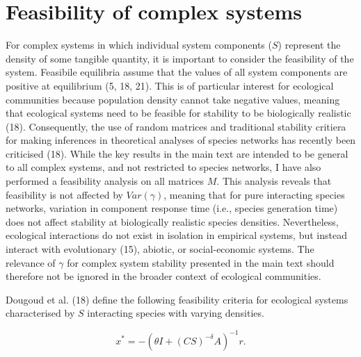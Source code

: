 \documentclass[]{article}
\begin{document}
\hypertarget{Feasibility}{\section{Feasibility of complex
systems}\label{Feasibility}}

For complex systems in which individual system components (\(S\))
represent the density of some tangible quantity, it is important to
consider the feasibility of the system. Feasibile equilibria assume that
the values of all system components are positive at equilibrium (5, 18,
21). This is of particular interest for ecological communities because
population density cannot take negative values, meaning that ecological
systems need to be feasible for stability to be biologically realistic
(18). Consequently, the use of random matrices and traditional stability
critiera for making inferences in theoretical analyses of species
networks has recently been criticised (18). While the key results in the
main text are intended to be general to all complex systems, and not
restricted to species networks, I have also performed a feasibility
analysis on all matrices \(M\). This analysis reveals that feasibility
is not affected by \(Var(\gamma)\), meaning that for pure interacting
species networks, variation in component response time (i.e., species
generation time) does not affect stability at biologically realistic
species densities. Nevertheless, ecological interactions do not exist in
isolation in empirical systems, but instead interact with evolutionary
(15), abiotic, or social-economic systems. The relevance of \(\gamma\)
for complex system stability presented in the main text should therefore
not be ignored in the broader context of ecological communities.

Dougoud et al. (18) define the following feasibility criteria for
ecological systems characterised by \(S\) interacting species with
varying densities.

\[x^{*} = -\left(\theta I + (CS)^{-\delta}A\right)^{-1}r.\]
\end{document}
